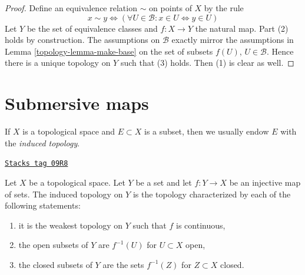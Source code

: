 \begin{proof}

Define an equivalence relation $\sim$ on points of $X$
by the rule
$$
x \sim y \Leftrightarrow
(\forall U \in \mathcal{B} : x \in U \Leftrightarrow y \in U)
$$
Let $Y$ be the set of equivalence classes and $f : X \to Y$
the natural map. Part (2) holds by construction.
The assumptions on $\mathcal{B}$ exactly
mirror the assumptions in Lemma \ref{topology-lemma-make-base}
on the set of subsets $f(U)$, $U \in \mathcal{B}$.
Hence there is a unique topology on $Y$ such that (3) holds.
Then (1) is clear as well.
\end{proof}

\section{Submersive maps}
\label{topology-section-submersive}
If $X$ is a topological space and $E \subset X$ is a subset, then
we usually endow $E$ with the {\it induced topology}.

\begin{lemma}[Induced]
\label{topology-lemma-induced}
\href{https://stacks.math.columbia.edu/tag/09R8}{\texttt{Stacks tag 09R8}}

Let $X$ be a topological space. Let $Y$ be a set and let
$f : Y \to X$ be an injective map of sets. The induced
topology on $Y$ is the topology characterized by
each of the following statements:
\begin{enumerate}
\item it is the weakest topology on $Y$ such that $f$ is continuous,
\item the open subsets of $Y$ are $f^{-1}(U)$ for $U \subset X$ open,
\item the closed subsets of $Y$ are the sets $f^{-1}(Z)$ for $Z \subset X$
closed.
\end{enumerate}
\end{lemma}


